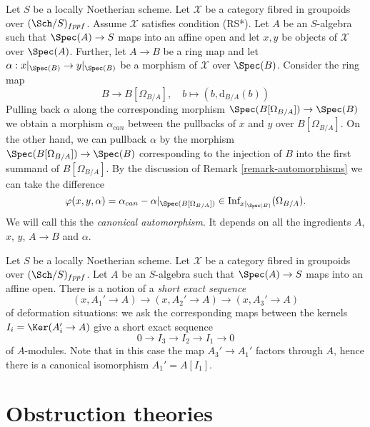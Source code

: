 \begin{remark}
\label{remark-canonical-isomorphism}
Let $S$ be a locally Noetherian scheme. Let $\mathcal{X}$ be a category
fibred in groupoids over $(\Sch/S)_{fppf}$. Assume $\mathcal{X}$ satisfies
condition (RS*). Let $A$ be an $S$-algebra such that
$\Spec(A) \to S$ maps into an affine open and let $x, y$ be objects of
$\mathcal{X}$ over $\Spec(A)$. Further, let $A \to B$ be a ring map and
let $\alpha : x|_{\Spec(B)} \to y|_{\Spec(B)}$ be a morphism of
$\mathcal{X}$ over $\Spec(B)$. Consider the ring map
$$
B \longrightarrow B[\Omega_{B/A}],
\quad
b \longmapsto (b, \text{d}_{B/A}(b))
$$
Pulling back $\alpha$ along the corresponding morphism
$\Spec(B[\Omega_{B/A}]) \to \Spec(B)$ we obtain a
morphism $\alpha_{can}$ between the pullbacks of $x$ and $y$ over
$B[\Omega_{B/A}]$. On the other hand, we can pullback $\alpha$
by the morphism $\Spec(B[\Omega_{B/A}]) \to \Spec(B)$ corresponding
to the injection of $B$ into the first summand of $B[\Omega_{B/A}]$.
By the discussion of Remark \ref{remark-automorphisms}
we can take the difference
$$
\varphi(x, y, \alpha) = \alpha_{can} - \alpha|_{\Spec(B[\Omega_{B/A}])} \in
\text{Inf}_{x|_{\Spec(B)}}(\Omega_{B/A}).
$$
We will call this the {\it canonical automorphism}. It depends
on all the ingredients $A$, $x$, $y$, $A \to B$ and $\alpha$.
\end{remark}

\begin{remark}
\label{remark-short-exact-sequence-thickenings}
Let $S$ be a locally Noetherian scheme. Let $\mathcal{X}$ be a category
fibred in groupoids over $(\Sch/S)_{fppf}$. Let $A$ be an $S$-algebra
such that $\Spec(A) \to S$ maps into an affine open. There
is a notion of a {\it short exact sequence}
$$
(x, A_1' \to A) \to (x, A_2' \to A) \to (x, A_3' \to A)
$$
of deformation situations: we ask the corresponding maps between
the kernels $I_i = \Ker(A_i' \to A)$ give a short exact sequence
$$
0 \to I_3 \to I_2 \to I_1 \to 0
$$
of $A$-modules. Note that in this case the map $A_3' \to A_1'$
factors through $A$, hence there is a canonical isomorphism
$A_1' = A[I_1]$.
\end{remark}





\section{Obstruction theories}
\label{section-obstruction-theory}

